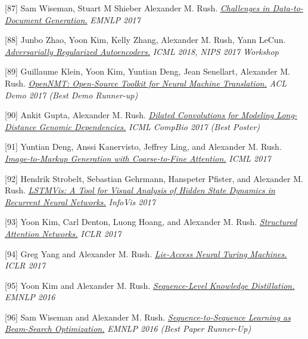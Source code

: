 \documentclass[10pt]{article}
\begin{document}
[87] \ind Sam Wiseman, Stuart M Shieber Alexander M. Rush. \emph{\href{ https://arxiv.org/abs/1707.08052 }{ Challenges in Data-to-Document Generation.} }\emph{ EMNLP 2017 }

\medskip


[88] \ind Junbo Zhao, Yoon Kim, Kelly Zhang, Alexander M. Rush, Yann LeCun. \emph{\href{ https://arxiv.org/abs/1706.04223 }{ Adversarially Regularized Autoencoders.} }\emph{ ICML 2018, NIPS 2017 Workshop }

\medskip


[89] \ind Guillaume Klein, Yoon Kim, Yuntian Deng, Jean Senellart, Alexander M. Rush. \emph{\href{ https://arxiv.org/abs/1701.02810 }{ OpenNMT: Open-Source Toolkit for Neural Machine Translation.} }\emph{ ACL Demo 2017 (Best Demo Runner-up) }

\medskip


[90] \ind Ankit Gupta, Alexander M. Rush. \emph{\href{ https://arxiv.org/abs/1710.01278 }{ Dilated Convolutions for Modeling Long-Distance Genomic Dependencies.} }\emph{ ICML CompBio 2017 (Best Poster) }

\medskip


[91] \ind Yuntian Deng, Anssi Kanervisto, Jeffrey Ling, and Alexander M. Rush. \emph{\href{ http://lstm.seas.harvard.edu/latex/ }{ Image-to-Markup Generation with Coarse-to-Fine Attention.} }\emph{ ICML 2017 }

\medskip


[92] \ind Hendrik Strobelt, Sebastian Gehrmann, Hanspeter Pfister, and Alexander M. Rush. \emph{\href{ http://lstm.seas.harvard.edu/ }{ LSTMVis: A Tool for Visual Analysis of Hidden State Dynamics in Recurrent Neural Networks.} }\emph{ InfoVis 2017 }

\medskip


[93] \ind Yoon Kim, Carl Denton, Luong Hoang, and Alexander M. Rush. \emph{\href{ https://arxiv.org/abs/1702.00887 }{ Structured Attention Networks.} }\emph{ ICLR 2017 }

\medskip


[94] \ind Greg Yang and Alexander M. Rush. \emph{\href{ http://lstm.seas.harvard.edu/lantm/ }{ Lie-Access Neural Turing Machines.} }\emph{ ICLR 2017 }

\medskip


[95] \ind Yoon Kim and Alexander M. Rush. \emph{\href{ http://arxiv.org/pdf/1606.07947v1.pdf }{ Sequence-Level Knowledge Distillation.} }\emph{ EMNLP 2016 }

\medskip


[96] \ind Sam Wiseman and Alexander M. Rush. \emph{\href{ http://arxiv.org/pdf/1606.02960.pdf }{ Sequence-to-Sequence Learning as Beam-Search Optimization.} }\emph{ EMNLP 2016 (Best Paper Runner-Up) }
\end{document}

